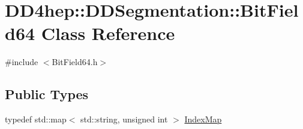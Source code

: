 \hypertarget{class_d_d4hep_1_1_d_d_segmentation_1_1_bit_field64}{
\section{DD4hep::DDSegmentation::BitField64 Class Reference}
\label{class_d_d4hep_1_1_d_d_segmentation_1_1_bit_field64}
}


{\ttfamily \#include $<$BitField64.h$>$}\subsection*{Public Types}
\begin{DoxyCompactItemize}
\item 
typedef std::map$<$ std::string, unsigned int $>$ \hyperlink{class_d_d4hep_1_1_d_d_segmentation_1_1_bit_field64_a332cc613098802352470f92c7a7c71fd}{IndexMap}
\end{DoxyCompactItemize}
